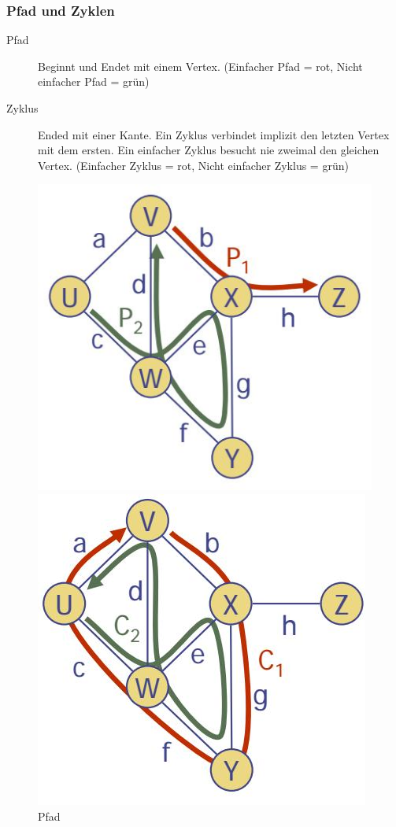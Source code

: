 \subsubsection{Pfad und Zyklen}
\begin{description}
	\item[Pfad] Beginnt und Endet mit einem Vertex. (Einfacher Pfad = rot, Nicht einfacher Pfad = grün)
	\item[Zyklus] Ended mit einer Kante. Ein Zyklus verbindet implizit den letzten Vertex mit dem ersten. Ein einfacher Zyklus besucht nie zweimal den gleichen Vertex. (Einfacher Zyklus = rot, Nicht einfacher Zyklus = grün)
\end{description}
\begin{figure}[ht!]
	\centering
	\begin{minipage}[t]{0.4\textwidth}
		\centering
		\includegraphics[width=0.9\linewidth]{images/graph_pfad}
		\caption{Pfad}
		\label{fig:graphpfad}
	\end{minipage}
	\begin{minipage}[t]{0.4\textwidth}
		\centering
		\includegraphics[width=0.9\linewidth]{images/graph_zyklus}

\end{minipage}
\end{figure}

